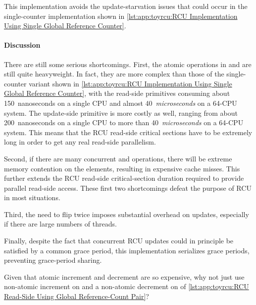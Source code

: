 This implementation avoids the update-starvation issues that could
occur in the single-counter implementation shown in
\cref{lst:app:toyrcu:RCU Implementation Using Single Global Reference Counter}.

\paragraph{Discussion}

There are still some serious shortcomings.
First, the atomic operations in 
and 
are still quite heavyweight.
In fact, they are more complex than those
of the single-counter variant shown in
\cref{lst:app:toyrcu:RCU Implementation Using Single Global Reference Counter},
with the read-side primitives consuming about 150~nanoseconds on a single
 CPU and almost 40~\emph{microseconds} on a 64-CPU system.
The update-side  primitive is more costly as
well, ranging from about 200~nanoseconds on a single  CPU to
more than 40~\emph{microseconds} on a 64-CPU system.
This means that the RCU read-side critical sections
have to be extremely long in order to get any real
read-side parallelism.

Second, if there are many concurrent 
and  operations, there will
be extreme memory contention on the 
elements, resulting in expensive cache misses.
This further extends the RCU read-side critical-section
duration required to provide parallel read-side access.
These first two shortcomings defeat the purpose of RCU in most
situations.

Third, the need to flip  twice imposes substantial
overhead on updates, especially if there are large
numbers of threads.

Finally, despite the fact that concurrent RCU updates could in principle be
satisfied by a common grace period, this implementation
serializes grace periods, preventing grace-period
sharing.

\QuickQuiz{}
	\begin{lineref}
	Given that atomic increment and decrement are so expensive,
	why not just use non-atomic increment on  and a
	non-atomic decrement on  of
	\cref{lst:app:toyrcu:RCU Read-Side Using Global Reference-Count Pair}?
	\end{lineref}
 \QuickQuizEnd

